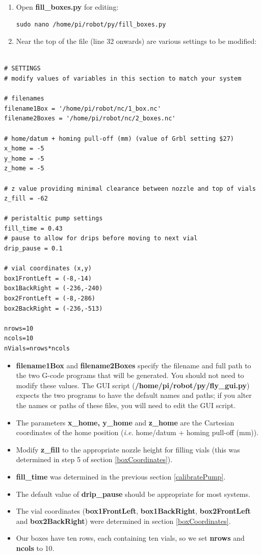 \documentclass[]{book}
\providecommand{\tightlist}{%
  \setlength{\itemsep}{0pt}\setlength{\parskip}{0pt}}
\theoremstyle{definition}
\theoremstyle{definition}
\theoremstyle{definition}
\theoremstyle{remark}
\begin{document}
\begin{enumerate}
\def\labelenumi{\arabic{enumi}.}
\item
  Open \textbf{fill\_boxes.py} for editing:

\begin{verbatim}
sudo nano /home/pi/robot/py/fill_boxes.py
\end{verbatim}
\item
  Near the top of the file (line 32 onwards) are various settings to be
  modified:
\end{enumerate}

\begin{verbatim}

# SETTINGS
# modify values of variables in this section to match your system

# filenames
filename1Box = '/home/pi/robot/nc/1_box.nc'
filename2Boxes = '/home/pi/robot/nc/2_boxes.nc'

# home/datum + homing pull-off (mm) (value of Grbl setting $27)
x_home = -5
y_home = -5
z_home = -5

# z value providing minimal clearance between nozzle and top of vials
z_fill = -62 

# peristaltic pump settings
fill_time = 0.43
# pause to allow for drips before moving to next vial
drip_pause = 0.1 

# vial coordinates (x,y)
box1FrontLeft = (-8,-14)
box1BackRight = (-236,-240)
box2FrontLeft = (-8,-286)
box2BackRight = (-236,-513)

nrows=10
ncols=10
nVials=nrows*ncols
\end{verbatim}

\begin{itemize}
\tightlist
\item
  \textbf{filename1Box} and \textbf{filename2Boxes} specify the filename
  and full path to the two G-code programs that will be generated. You
  should not need to modify these values. The GUI script
  (\textbf{/home/pi/robot/py/fly\_gui.py}) expects the two programs to
  have the default names and paths; if you alter the names or paths of
  these files, you will need to edit the GUI script.
\item
  The parameters \textbf{x\_home, y\_home} and \textbf{z\_home} are the
  Cartesian coordinates of the home position (\emph{i.e.} home/datum +
  homing pull-off (mm)).
\item
  Modify \textbf{z\_fill} to the appropriate nozzle height for filling
  vials (this was determined in step 5 of section \ref{boxCoordinates}).
\item
  \textbf{fill\_time} was determined in the previous section
  \ref{calibratePump}.
\item
  The default value of \textbf{drip\_pause} should be appropriate for
  most systems.
\item
  The vial coordinates (\textbf{box1FrontLeft}, \textbf{box1BackRight},
  \textbf{box2FrontLeft} and \textbf{box2BackRight}) were determined in
  section \ref{boxCoordinates}.
\item
  Our boxes have ten rows, each containing ten vials, so we set
  \textbf{nrows} and \textbf{ncols} to 10.
\end{itemize}
\end{document}
